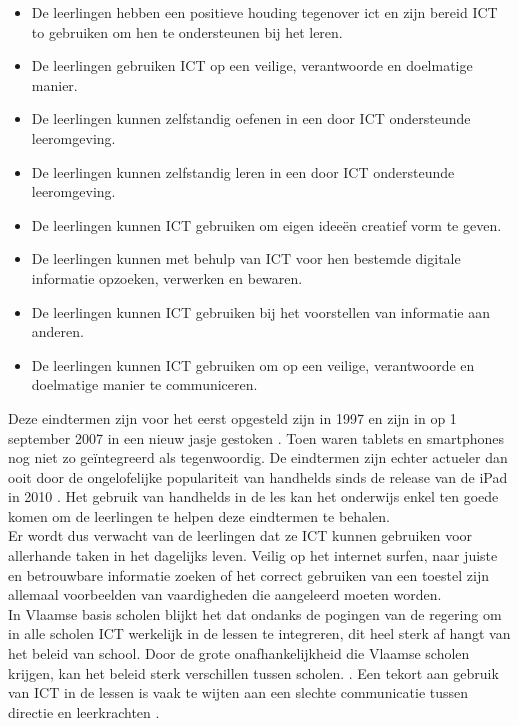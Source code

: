 \documentclass[pdftex,a4paper,12pt,twoside]{report}
\begin{document}
	\begin{itemize}
	  \item De leerlingen hebben een positieve houding tegenover ict en zijn bereid ICT to gebruiken om hen te ondersteunen bij het leren.
		\item De leerlingen gebruiken ICT op een veilige, verantwoorde en doelmatige manier.
		\item De leerlingen kunnen zelfstandig oefenen in een door ICT ondersteunde leeromgeving.
		\item De leerlingen kunnen zelfstandig leren in een door ICT ondersteunde leeromgeving.
		\item De leerlingen kunnen ICT gebruiken om eigen ideeën creatief vorm te geven.
		\item De leerlingen kunnen met behulp van ICT voor hen bestemde digitale informatie opzoeken, verwerken en bewaren.
		\item De leerlingen kunnen ICT gebruiken bij het voorstellen van informatie aan anderen.
		\item De leerlingen kunnen ICT gebruiken om op een veilige, verantwoorde en doelmatige manier te communiceren.
	\end{itemize}
	 Deze eindtermen zijn voor het eerst opgesteld zijn in 1997 en zijn in op 1 september 2007 in een nieuw jasje gestoken \citep{besluitEindtermen}. Toen waren tablets en smartphones nog niet zo ge\"integreerd als tegenwoordig. De eindtermen zijn echter actueler dan ooit door de ongelofelijke populariteit van handhelds sinds de release van de iPad in 2010 \citep{choi2013strategic}. Het gebruik van handhelds in de les kan het onderwijs enkel ten goede komen om de leerlingen te helpen deze eindtermen te behalen. \\
	
 Er wordt dus verwacht van de leerlingen dat ze ICT kunnen gebruiken voor allerhande taken in het dagelijks leven. Veilig op het internet surfen, naar juiste en betrouwbare informatie zoeken of het correct gebruiken van een toestel zijn allemaal voorbeelden van vaardigheden die aangeleerd moeten worden.\\

In Vlaamse basis scholen blijkt het dat ondanks de pogingen van de regering om in alle scholen ICT werkelijk in de lessen te integreren,  dit heel sterk af hangt van het beleid van school. Door de grote onafhankelijkheid die Vlaamse scholen krijgen, kan het beleid sterk verschillen tussen scholen. \citep{tondeur2007curricula}. Een tekort aan gebruik van ICT in de lessen is vaak te wijten aan een slechte communicatie tussen directie en leerkrachten \citep{tondeur2007curricula}. 
\end{document}
